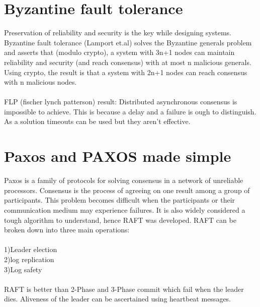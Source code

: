\documentclass[twoside]{article}
\begin{document}
\section{Byzantine fault tolerance}
Preservation of reliability and security is the key while designing systems. Byzantine fault tolerance (Lamport et.al) solves the Byzantine generals problem and asserts that (modulo crypto), a system with 3n+1 nodes can maintain reliability and security (and reach consensus) with at most n malicious generals. Using crypto, the result is that a system with 2n+1 nodes can reach consensus with n malicious nodes. \\\\FLP (fischer lynch patterson) result: Distributed asynchronous consensus is impossible to achieve. This is because a delay and a failure is ough to distinguish. As a solution timeouts can be used but they aren't effective.
\section{Paxos and PAXOS made simple}
Paxos is a family of protocols for solving consensus in a network of unreliable processors. Consensus is the process of agreeing on one result among a group of participants. This problem becomes difficult when the participants or their communication medium may experience failures. It is also widely considered a tough algorithm to understand, hence RAFT was developed. RAFT can be broken down into three main operations:\\\\1)Leader election\\2)log replication\\3)Log safety \\\\ RAFT is better than 2-Phase and 3-Phase commit which fail when the leader dies. Aliveness of the leader can be ascertained using heartbeat messages.
\end{document}
